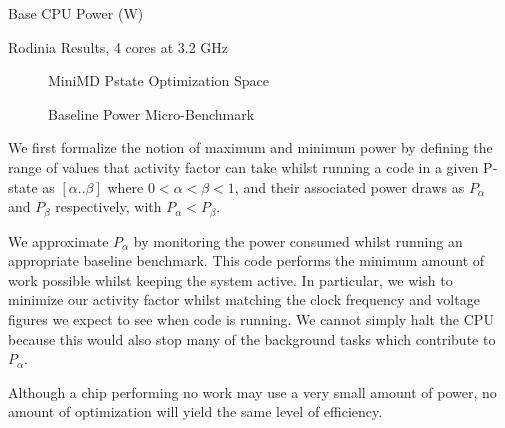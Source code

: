 \begin{table}
\centering

\caption{Base CPU Power (W)}
\end{table} 

\begin{table}
\centering

\caption{Rodinia Results, 4 cores at 3.2 GHz}
\end{table} 


\begin{figure}
\centering

\caption{MiniMD Pstate Optimization Space}
\label{fig:minimd-pstates}
\end{figure}


\begin{figure}[ht]                                                               
\centering                                                                      
\lstset{basicstyle=\ttfamily\footnotesize\bfseries, frame=tb} %
              
\caption{Baseline Power Micro-Benchmark}                            
\label{fig:microbench}                                                           
\end{figure}  



We first formalize the notion of maximum and minimum power by defining the range of values that activity factor can take whilst running a code in a given P-state as $[\alpha  .. \beta]$ where $0 < \alpha < \beta < 1$, and their associated power draws as $P_{\alpha}$ and $P_{\beta}$ respectively, with $P_{\alpha} < P_{\beta}$. 


We approximate $P_{\alpha}$ by monitoring the power consumed whilst running an appropriate baseline benchmark. This code performs the minimum amount of work possible whilst keeping the system active. In particular, we wish to minimize our activity factor whilst matching the clock frequency and voltage figures we expect to see when code is running. We cannot simply halt the CPU because this would also stop many of the background tasks which contribute to $P_{\alpha}$.


Although a chip performing no work may use a very small amount of power, no amount of optimization will yield the same level of efficiency.


